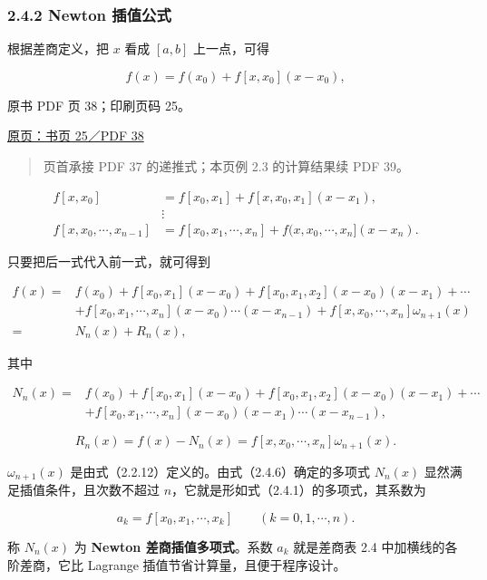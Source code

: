 \subsubsection{2.4.2 Newton 插值公式}\label{ch02a-newton-ux63d2ux503cux516cux5f0f}

根据差商定义，把 \(x\) 看成 \([a,b]\) 上一点，可得

\[
f(x)=f(x_0)+f[x,x_0](x-x_0),
\]

\clearpage

原书 PDF 页 38；印刷页码 25。

\href{source-images/pdf-038.jpeg}{原页：书页 25／PDF 38}

\begin{quote}
页首承接 PDF 37 的递推式；本页例 2.3 的计算结果续 PDF 39。
\end{quote}

\[
\begin{aligned}
f[x,x_0]&=f[x_0,x_1]+f[x,x_0,x_1](x-x_1),\\
&\vdots\\
f[x,x_0,\cdots,x_{n-1}]&=f[x_0,x_1,\cdots,x_n]+f(x,x_0,\cdots,x_n](x-x_n).
\end{aligned}
\]

只要把后一式代入前一式，就可得到

\[
\begin{aligned}
f(x)={}&f(x_0)+f[x_0,x_1](x-x_0)+f[x_0,x_1,x_2](x-x_0)(x-x_1)+\cdots\\
&+f[x_0,x_1,\cdots,x_n](x-x_0)\cdots(x-x_{n-1})+f[x,x_0,\cdots,x_n]\omega_{n+1}(x)\\
={}&N_n(x)+R_n(x),
\end{aligned}
\]

其中

\[
\begin{aligned}
N_n(x)={}&f(x_0)+f[x_0,x_1](x-x_0)+f[x_0,x_1,x_2](x-x_0)(x-x_1)+\cdots\\
&+f[x_0,x_1,\cdots,x_n](x-x_0)(x-x_1)\cdots(x-x_{n-1}),
\end{aligned}
\tag{2.4.6}
\]

\[
R_n(x)=f(x)-N_n(x)=f[x,x_0,\cdots,x_n]\omega_{n+1}(x).
\tag{2.4.7}
\]

\(\omega_{n+1}(x)\) 是由式（2.2.12）定义的。由式（2.4.6）确定的多项式 \(N_n(x)\) 显然满足插值条件，且次数不超过 \(n\)，它就是形如式（2.4.1）的多项式，其系数为

\[
a_k=f[x_0,x_1,\cdots,x_k]\qquad(k=0,1,\cdots,n).
\]

称 \(N_n(x)\) 为 \textbf{Newton 差商插值多项式}。系数 \(a_k\) 就是差商表 2.4 中加横线的各阶差商，它比 Lagrange 插值节省计算量，且便于程序设计。

